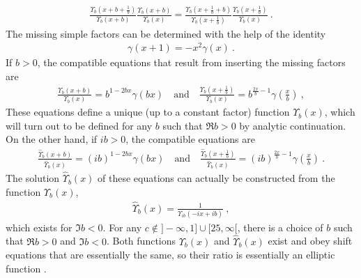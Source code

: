 \documentclass[12pt, a4paper, notitlepage, twoside]{report}
\numberwithin{equation}{section}
\theoremstyle{break}
\begin{document}
\begin{align}
  \frac{\Upsilon_b(x+b+\frac{1}{b})}{\Upsilon_b(x+b)} \frac{\Upsilon_b(x+b)}{\Upsilon_b(x)} = \frac{\Upsilon_b(x+\frac{1}{b}+b)}{\Upsilon_b(x+\frac{1}{b})} \frac{\Upsilon_b(x+\frac{1}{b})}{\Upsilon_b(x)} \ .
\end{align}
The missing simple factors can be determined with the help of the identity
\begin{align}
 \gamma(x+1) = -x^2 \gamma(x) \ .
\end{align}
If $b>0$, the compatible equations that result from inserting the missing factors are 
\begin{align}
  \boxed{\frac{\Upsilon_b(x+b)}{\Upsilon_b(x)} = b^{1-2bx} \gamma(bx)}\quad \text{and} \quad \boxed{\frac{\Upsilon_b(x+\frac{1}{b})}{\Upsilon_b(x)} = b^{\frac{2x}{b}-1} \gamma(\tfrac{x}{b})}\ ,
\label{upup}
\end{align}
These equations define a unique (up to a constant factor) function $\Upsilon_b(x)$, which will turn out to be defined for any $b$ such that $\Re b > 0$ by analytic continuation. 
On the other hand, if $ib>0$, the compatible equations are 
\begin{align}
 \frac{\hat{\Upsilon}_b(x+b)}{\hat{\Upsilon}_b(x)} = (ib)^{1-2bx} \gamma(bx)\quad \text{and} \quad \frac{\hat{\Upsilon}_b(x+\frac{1}{b})}{\hat{\Upsilon}_b(x)} = (ib)^{\frac{2x}{b}-1} \gamma(\tfrac{x}{b})\ .
\end{align}
The solution $\hat\Upsilon_b(x)$ of these equations can actually be constructed from the function $\Upsilon_b(x)$,
\begin{align}
 \boxed{ \hat{\Upsilon}_b(x) = \frac{1}{\Upsilon_{ib}(-ix+ib)} }\ ,
\label{tub}
\end{align}
which exists for $\Im b < 0$. 
For any $c\notin ]-\infty, 1] \cup [25,\infty[$, there is a choice of $b$ such that $\Re b>0$ and $\Im b<0$. 
Both functions $\Upsilon_b(x)$ and $\hat\Upsilon_b(x)$ exist and obey shift equations that are essentially the same, so their ratio is essentially an elliptic function \cite{zam05}. 
\end{document}
